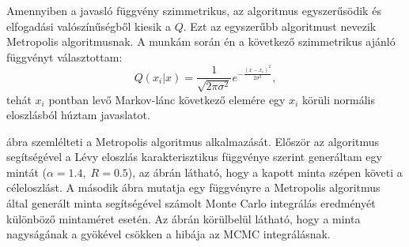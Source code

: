 \documentclass[11pt,a4paper]{article}
\numberwithin{equation}{subsection}
\numberwithin{figure}{section}
\begin{document}
Amennyiben a javasló függvény szimmetrikus, az algoritmus egyszerűsödik és ~ elfogadási valószínűségből kiesik a $Q$. Ezt az egyszerűbb algoritmust nevezik Metropolis algoritmusnak. A munkám során én a következő szimmetrikus ajánló függvényt választottam:
\begin{equation}
Q(x_i|x) = \frac{1}{\sqrt{2\pi\sigma^2}}e^{-\frac{(x-x_i)^2}{2\sigma^2}},
\end{equation}
tehát $x_i$ pontban levő Markov-lánc következő elemére egy $x_i$ körüli normális eloszlásból húztam javaslatot.

 ábra szemlélteti a Metropolis algoritmus alkalmazását. Először az algoritmus segítségével a Lévy eloszlás karakterisztikus függvénye szerint generáltam egy mintát ($\alpha=1.4,\;R=0.5$), az ábrán látható, hogy a kapott minta szépen követi a céleloszlást. A második ábra mutatja egy függvényre a Metropolis algoritmus által generált minta segítségével számolt Monte Carlo integrálás eredményét különböző mintaméret esetén. Az ábrán körülbelül látható, hogy a minta nagyságának a gyökével csökken a hibája az MCMC integrálásnak.
\end{document}
